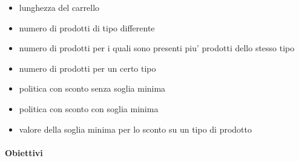 \begin{itemize}
  \item lunghezza del carrello
  \item numero di prodotti di tipo differente
  \item numero di prodotti per i quali sono presenti piu' prodotti dello stesso tipo
  \item numero di prodotti per un certo tipo
  \item politica con sconto senza soglia minima
  \item politica con sconto con soglia minima
  \item valore della soglia minima per lo sconto su un tipo di prodotto
\end{itemize}

\paragraph{Obiettivi}

